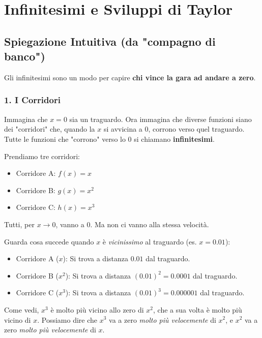 

\newcommand{\R}{\mathbb{R}}
\newcommand{\N}{\mathbb{N}}


\section{Infinitesimi e Sviluppi di Taylor}

\subsection{Spiegazione Intuitiva (da "compagno di banco")}
Gli infinitesimi sono un modo per capire \textbf{chi vince la gara ad andare a zero}.

\subsubsection{1. I Corridori}
Immagina che $x=0$ sia un traguardo.
Ora immagina che diverse funzioni siano dei "corridori" che, quando la $x$ si avvicina a 0, corrono verso quel traguardo.
Tutte le funzioni che "corrono" verso lo 0 si chiamano \textbf{infinitesimi}.

Prendiamo tre corridori:
\begin{itemize}
    \item Corridore A: $f(x) = x$
    \item Corridore B: $g(x) = x^2$
    \item Corridore C: $h(x) = x^3$
\end{itemize}
Tutti, per $x \to 0$, vanno a 0. Ma non ci vanno alla stessa velocità.

Guarda cosa succede quando $x$ è \textit{vicinissimo} al traguardo (es. $x = 0.01$):
\begin{itemize}
    \item Corridore A ($x$): Si trova a distanza $0.01$ dal traguardo.
    \item Corridore B ($x^2$): Si trova a distanza $(0.01)^2 = 0.0001$ dal traguardo.
    \item Corridore C ($x^3$): Si trova a distanza $(0.01)^3 = 0.000001$ dal traguardo.
\end{itemize}
Come vedi, $x^3$ è molto più vicino allo zero di $x^2$, che a sua volta è molto più vicino di $x$.
Possiamo dire che $x^3$ va a zero \textit{molto più velocemente} di $x^2$, e $x^2$ va a zero \textit{molto più velocemente} di $x$.

